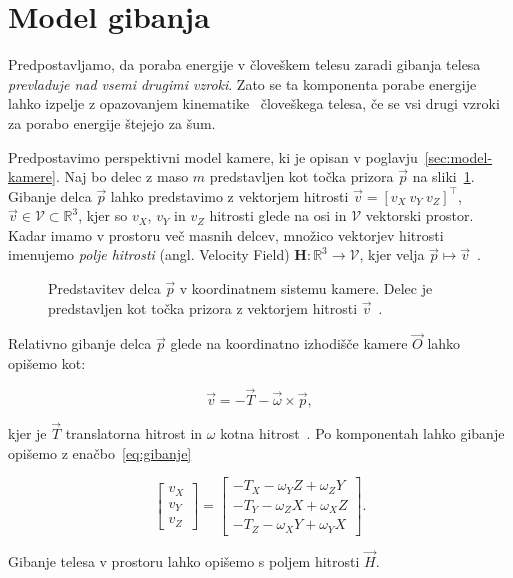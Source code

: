 \section{Model gibanja}\label{sec:model-gibanja}
Predpostavljamo, da poraba energije v človeškem telesu zaradi gibanja telesa \emph{prevladuje nad vsemi
drugimi vzroki}. Zato se ta komponenta porabe energije lahko izpelje z opazovanjem kinematike~\cite{levine2005measurement} človeškega telesa, če se vsi drugi vzroki za porabo energije štejejo za šum.

Predpostavimo perspektivni model kamere, ki je opisan v poglavju~\ref{sec:model-kamere}.
Naj bo delec z maso $m$ predstavljen kot točka prizora $\vec{p}$ na sliki~\ref{fig:model-gibanja}. Gibanje delca $\vec{p}$ lahko predstavimo z vektorjem hitrosti $\vec{v} = [v_X~v_Y~v_Z]^\top$, $\vec{v} \in \mathcal{V} \subset \mathbb{R}^3$, kjer so $v_X$, $v_Y$ in $v_Z$ hitrosti glede na osi in $\mathcal{V}$ vektorski prostor. Kadar imamo v prostoru več masnih delcev, množico vektorjev hitrosti imenujemo \emph{polje hitrosti} (angl. Velocity Field) $\mathbf{H}: \mathbb{R}^3 \to \mathcal{V}$, kjer velja $\vec{p} \mapsto \vec{v}$~\cite{trucco1998introductory}.


\begin{figure}[htb]
\centering

\caption[Predstavitev delca $\vec{p}$ v koordinatnem sistemu kamere]{Predstavitev delca $\vec{p}$ v koordinatnem sistemu kamere. Delec je predstavljen kot točka prizora z vektorjem hitrosti $\vec{v}$~\cite{trucco1998introductory}.}
\label{fig:model-gibanja}
\end{figure}



Relativno gibanje delca $\vec{p}$ glede na koordinatno izhodišče kamere $\vec{O}$ lahko opišemo kot:

\begin{equation}
	\vec{v} = -\vec{T}-\vec{\omega}\times\vec{p},
\end{equation}

kjer je $\vec{T}$ translatorna hitrost in $\omega$ kotna hitrost~\cite{trucco1998introductory}. Po komponentah lahko gibanje opišemo z enačbo~\eqref{eq:gibanje}

\begin{equation} \label{eq:gibanje}
	\begin{bmatrix}
	v_X \\ v_Y \\ v_Z
	\end{bmatrix}
    =
    \begin{bmatrix}
    - T_X - \omega_Y Z + \omega_Z Y \\
    - T_Y - \omega_Z X + \omega_X Z \\
    - T_Z - \omega_X Y + \omega_Y X
    \end{bmatrix}.
\end{equation}

Gibanje telesa v prostoru lahko opišemo s poljem hitrosti $\vec{H}$.


